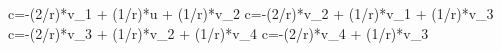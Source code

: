 c=-(2/r)*v_1 + (1/r)*u + (1/r)*v_2
c=-(2/r)*v_2 + (1/r)*v_1 + (1/r)*v_3
c=-(2/r)*v_3 + (1/r)*v_2 + (1/r)*v_4
c=-(2/r)*v_4 + (1/r)*v_3
